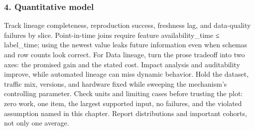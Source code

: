 \subsubsection*{4. Quantitative model}
Track lineage completeness, reproduction success, freshness lag, and data-quality failures by slice. Point-in-time joins require feature availability\_time ≤ label\_time; using the newest value leaks future information even when schemas and row counts look correct.
For Data lineage, turn the prose tradeoff into two axes: the promised gain and the stated cost. Impact analysis and auditability improve, while automated lineage can miss dynamic behavior. Hold the dataset, traffic mix, versions, and hardware fixed while sweeping the mechanism's controlling parameter.
Check units and limiting cases before trusting the plot: zero work, one item, the largest supported input, no failures, and the violated assumption named in this chapter. Report distributions and important cohorts, not only one average.
